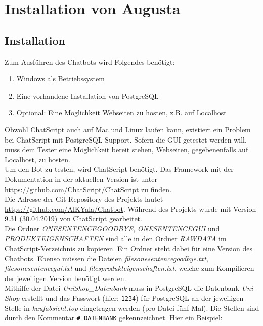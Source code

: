 \chapter{Installation von Augusta}
\label{sec:InstallationAugusta}

\section{Installation}
\label{sec:Installation}

Zum Ausführen des Chatbots wird Folgendes benötigt:

\begin{enumerate}
\item {Windows als Betriebssystem}
\item {Eine vorhandene Installation von PostgreSQL}
\item {Optional: Eine Möglichkeit Webseiten zu hosten, z.B. auf Localhost}
\end{enumerate}

Obwohl ChatScript auch auf Mac und Linux laufen kann, existiert ein Problem bei ChatScript mit PostgreSQL-Support. Sofern die GUI getestet werden will, muss dem Tester eine Möglichkeit bereit stehen, Webseiten, gegebenenfalls auf Localhost, zu hosten. \\
Um den Bot zu testen, wird ChatScript benötigt. Das Framework mit der Dokumentation in der aktuellen Version ist unter \url{https://github.com/ChatScript/ChatScript} zu finden.\\
Die Adresse der Git-Repository des Projekts lautet \url{https://github.com/AlKYala/Chatbot}. Während des Projekts wurde mit Version 9.31 (30.04.2019) von ChatScript gearbeitet.\\
Die Ordner \textit{ONESENTENCEGOODBYE}, \textit{ONESENTENCEGUI} und \textit{PRODUKTEIGENSCHAFTEN} sind alle in den Ordner \textit{RAWDATA} im ChatScript-Verzeichnis zu kopieren. Ein Ordner steht dabei für eine Version des Chatbots. Ebenso müssen die Dateien \textit{filesonesentencegoodbye.txt}, \textit{filesonesentencegui.txt} und \textit{filesprodukteigenschaften.txt}, welche zum Kompilieren der jeweiligen Version benötigt werden.\\
Mithilfe der Datei \textit{UniShop\_Datenbank} muss in PostgreSQL die Datenbank \textit{Uni-Shop} erstellt und das Passwort (hier: \lstinline|1234|) für PostgreSQL an der jeweiligen Stelle in \textit{kaufabsicht.top} eingetragen werden (pro Datei fünf Mal). Die Stellen sind durch den Kommentar \lstinline|# DATENBANK| gekennzeichnet. Hier ein Beispiel:

